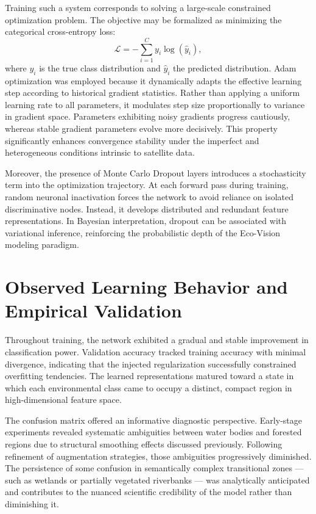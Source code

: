 \documentclass[12pt,a4paper]{report}
\begin{document}
Training such a system corresponds to solving a large-scale constrained optimization problem. The objective may be formalized as minimizing the categorical cross-entropy loss:
\[
\mathcal{L} = - \sum_{i=1}^{C} y_i \log(\hat{y}_i),
\]
where \(y_i\) is the true class distribution and \(\hat{y}_i\) the predicted distribution. Adam optimization was employed because it dynamically adapts the effective learning step according to historical gradient statistics. Rather than applying a uniform learning rate to all parameters, it modulates step size proportionally to variance in gradient space. Parameters exhibiting noisy gradients progress cautiously, whereas stable gradient parameters evolve more decisively. This property significantly enhances convergence stability under the imperfect and heterogeneous conditions intrinsic to satellite data.

Moreover, the presence of Monte Carlo Dropout layers introduces a stochasticity term into the optimization trajectory. At each forward pass during training, random neuronal inactivation forces the network to avoid reliance on isolated discriminative nodes. Instead, it develops distributed and redundant feature representations. In Bayesian interpretation, dropout can be associated with variational inference, reinforcing the probabilistic depth of the Eco-Vision modeling paradigm.

\section{Observed Learning Behavior and Empirical Validation}

Throughout training, the network exhibited a gradual and stable improvement in classification power. Validation accuracy tracked training accuracy with minimal divergence, indicating that the injected regularization successfully constrained overfitting tendencies. The learned representations matured toward a state in which each environmental class came to occupy a distinct, compact region in high-dimensional feature space.

The confusion matrix offered an informative diagnostic perspective. Early-stage experiments revealed systematic ambiguities between water bodies and forested regions due to structural smoothing effects discussed previously. Following refinement of augmentation strategies, those ambiguities progressively diminished. The persistence of some confusion in semantically complex transitional zones — such as wetlands or partially vegetated riverbanks — was analytically anticipated and contributes to the nuanced scientific credibility of the model rather than diminishing it.
\end{document}
